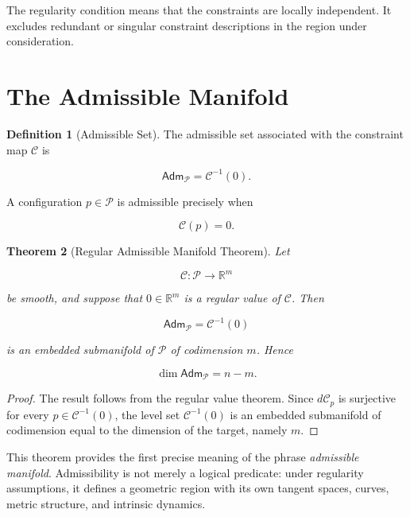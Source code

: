 \documentclass[11pt,oneside]{book}
\numberwithin{equation}{chapter}
\theoremstyle{definition}
\newtheorem{definition}{Definition}[chapter]
\theoremstyle{plain}
\newtheorem{theorem}[definition]{Theorem}
\newcommand{\Adm}{\mathsf{Adm}}
\begin{document}
The regularity condition means that the constraints are locally independent.
It excludes redundant or singular constraint descriptions in the region
under consideration.

\section{The Admissible Manifold}

\begin{definition}[Admissible Set]

The admissible set associated with the constraint map \(\mathcal C\) is

\[
\Adm_{\mathcal P}
=
\mathcal C^{-1}(0).
\]

A configuration \(p\in\mathcal P\) is admissible precisely when

\[
\mathcal C(p)=0.
\]

\end{definition}

\begin{theorem}[Regular Admissible Manifold Theorem]

Let

\[
\mathcal C:\mathcal P\longrightarrow\mathbb R^m
\]

be smooth, and suppose that \(0\in\mathbb R^m\) is a regular value of
\(\mathcal C\). Then

\[
\Adm_{\mathcal P}
=
\mathcal C^{-1}(0)
\]

is an embedded submanifold of \(\mathcal P\) of codimension \(m\). Hence

\[
\dim\Adm_{\mathcal P}
=
n-m.
\]

\end{theorem}

\begin{proof}

The result follows from the regular value theorem. Since
\(d\mathcal C_p\) is surjective for every
\(p\in\mathcal C^{-1}(0)\), the level set \(\mathcal C^{-1}(0)\) is an
embedded submanifold of codimension equal to the dimension of the target,
namely \(m\).

\end{proof}

This theorem provides the first precise meaning of the phrase \emph{admissible manifold}. Admissibility is not merely a logical predicate: under regularity assumptions, it defines a geometric region with its own tangent spaces, curves, metric structure, and intrinsic dynamics.
\end{document}
